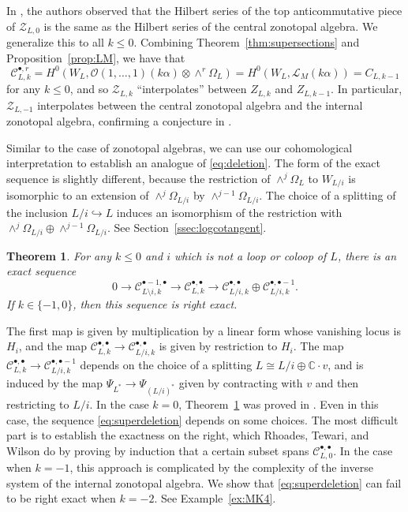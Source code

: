 \documentclass{amsart}
\newtheorem{theorem}{Theorem}[section]
\theoremstyle{definition}
\begin{document}
In \cite{Superspace}, the authors observed that the Hilbert series of the top anticommutative piece of $\mathcal{Z}_{L, 0}$ is the same as the Hilbert series of the central zonotopal algebra. We generalize this to all $k \le 0$. Combining Theorem~\ref{thm:supersections} and Proposition~\ref{prop:LM}, we have that
$$\mathcal{C}_{L, k}^{\bullet, r} = H^0(W_L, \mathcal{O}(1, \dotsc, 
1)(k\alpha)\otimes \wedge^r \Omega_L) = H^0(W_L, \mathcal{L}_M(k\alpha)) 
= C_{L, k-1}$$
for any $k \le 0$,
and so $\mathcal{Z}_{L, k}$ ``interpolates'' between $Z_{L,k}$ and $Z_{L, k-1}$. In particular, $\mathcal{Z}_{L, -1}$ interpolates between the central zonotopal algebra and the internal zonotopal algebra, confirming a conjecture in \cite{Superspace}.

Similar to the case of zonotopal algebras, we can use our cohomological interpretation to establish an analogue of \eqref{eq:deletion}. The form of the exact sequence is slightly different, because the restriction of $\wedge^j \Omega_L$ to $W_{L/i}$ is isomorphic to an extension of $\wedge^j \Omega_{L/i}$ by $\wedge^{j-1} \Omega_{L/i}$. The choice of a splitting of the inclusion $L/i \hookrightarrow L$ induces an isomorphism of the restriction with $\wedge^j \Omega_{L/i} \oplus \wedge^{j-1} \Omega_{L/i}$. See Section~\ref{ssec:logcotangent}. 

\begin{theorem}\label{thm:superspaceexact}
For any $k \le 0$ and $i$ which is not a loop or coloop of $L$, there is an exact sequence
\begin{equation}\label{eq:superdeletion}
0 \to \mathcal{C}_{L \setminus i, k}^{\bullet - 1, \bullet} \to \mathcal{C}_{L, k}^{\bullet, \bullet} \to \mathcal{C}_{L/i, k}^{\bullet, \bullet} \oplus \mathcal{C}_{L/i, k}^{\bullet, \bullet - 1}.
\end{equation}
If $k \in \{-1, 0\}$, then this sequence is right exact. 
\end{theorem}

The first map is given by multiplication by a linear form whose 
vanishing locus is $H_i$, and the map $\mathcal{C}_{L, k}^{\bullet, 
\bullet} \to \mathcal{C}_{L/i, k}^{\bullet, \bullet}$ is given by 
restriction to $H_i$. The map $\mathcal{C}_{L, k}^{\bullet, \bullet} \to 
\mathcal{C}_{L/i, k}^{\bullet, \bullet - 1}$ depends on the choice of a 
splitting $L \cong L/i \oplus \mathbb{C} \cdot v$, and is induced by the map $\Psi_{L^*} \to 
\Psi_{(L/i)^*}$ given by contracting with $v$ and then restricting to 
$L/i$. 
In the case $k=0$, Theorem~\ref{thm:superspaceexact} was proved in \cite[Section 3.4]{Superspace}. Even in this case, the sequence \eqref{eq:superdeletion} depends on some choices. 
The most difficult part is to establish the exactness on the right, 
which Rhoades, Tewari, and Wilson do by proving by induction that a 
certain subset spans $\mathcal{C}_{L, 0}^{\bullet,\bullet}$. In the case when $k=-1$, this approach is complicated by the complexity of the inverse system of the internal zonotopal algebra. We show that \eqref{eq:superdeletion} can fail to be right exact when $k=-2$. See Example~\ref{ex:MK4}. 
\end{document}
